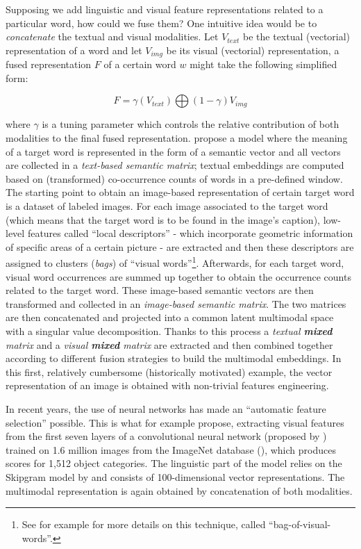 \documentclass[
]{krantz}
\begin{document}
Supposing we add linguistic and visual feature representations related to a particular word, how could we fuse them? One intuitive idea would be to \emph{concatenate} the textual and visual modalities. Let \(V_{text}\) be the textual (vectorial) representation of a word and let \(V_{img}\) be its visual (vectorial) representation, a fused representation \(F\) of a certain word \(w\) might take the following simplified form:

\[F=\gamma(V_{text})\bigoplus(1-\gamma)V_{img}\]

where \(\gamma\) is a tuning parameter which controls the relative contribution of both modalities to the final fused representation. \citet{bruni2014multimodal} propose a model where the meaning of a target word is represented in the form of a semantic vector and all vectors are collected in a \emph{text-based semantic matrix}; textual embeddings are computed based on (transformed) co-occurrence counts of words in a pre-defined window. The starting point to obtain an image-based representation of certain target word is a dataset of labeled images. For each image associated to the target word (which means that the target word is to be found in the image's caption), low-level features called ``local descriptors'' - which incorporate geometric information of specific areas of a certain picture - are extracted and then these descriptors are assigned to clusters (\emph{bags}) of ``visual words''\footnote{See for example \citet{bosch2007image} for more details on this technique, called ``bag-of-visual-words''.}. Afterwards, for each target word, visual word occurrences are summed up together to obtain the occurrence counts related to the target word. These image-based semantic vectors are then transformed and collected in an \emph{image-based semantic matrix}. The two matrices are then concatenated and projected into a common latent multimodal space with a singular value decomposition. Thanks to this process a \emph{textual \textbf{mixed} matrix} and a \emph{visual \textbf{mixed} matrix} are extracted and then combined together according to different fusion strategies to build the multimodal embeddings. In this first, relatively cumbersome (historically motivated) example, the vector representation of an image is obtained with non-trivial features engineering.

In recent years, the use of neural networks has made an ``automatic feature selection'' possible. This is what for example \citet{kiela2014learning} propose, extracting visual features from the first seven layers of a convolutional neural network (proposed by \citet{krizhevsky2012imagenet}) trained on 1.6 million images from the ImageNet database (\citet{deng2009imagenet}), which produces scores for 1,512 object categories. The linguistic part of the model relies on the Skipgram model by \citet{mikolov2013efficient} and consists of 100-dimensional vector representations. The multimodal representation is again obtained by concatenation of both modalities.
\end{document}
